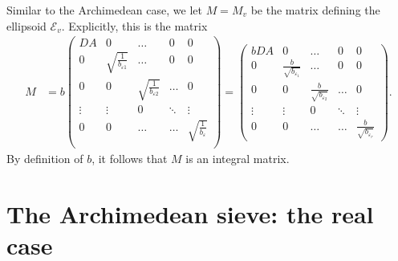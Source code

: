 \documentclass[11pt]{report}
\theoremstyle{definition}
\begin{document}
Similar to the Archimedean case, we let $M=M_v$ be the matrix defining the ellipsoid $\mathcal{E}_{v}$. Explicitly, this is the matrix
\begin{align*}
  M & = b \begin{pmatrix}
    DA & 0 & \dots & 0 & 0\\
    0 & \sqrt{\frac{1}{b_{\varepsilon 1}}} & \dots & 0 & 0\\
    0 & 0  & \sqrt{\frac{1}{b_{\varepsilon 2}}} & \dots & 0\\
    \vdots & \vdots &0 &  \ddots & \vdots\\
    0 & 0 & \dots & \dots & \sqrt{\frac{1}{b_{\varepsilon}}} \\
  \end{pmatrix}
  = \begin{pmatrix}
    bDA & 0 & \dots & 0 & 0\\
    0 & \frac{b}{\sqrt{b_{\varepsilon_1}}} & \dots & 0 & 0\\
    0 & 0  & \frac{b}{\sqrt{b_{\varepsilon_2}}} & \dots & 0\\
    \vdots & \vdots &0 &  \ddots & \vdots\\
    0 & 0 & \dots & \dots & \frac{b}{\sqrt{b_{\varepsilon_r}}}
  \end{pmatrix}.
\end{align*}
By definition of $b$, it follows that $M$ is an integral matrix.


\section{The Archimedean sieve: the real case}
\label{sec:archsieve}
\end{document}
